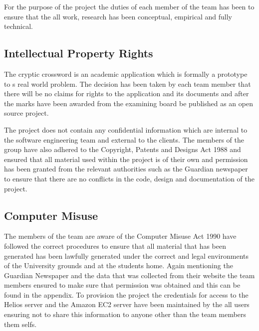 For the purpose of the project the duties of each member of the team has been to ensure that the all work, research has been conceptual, empirical and fully technical.

\subsection{Intellectual Property Rights}

The cryptic crossword is an academic application which is formally a prototype to s real world problem. The decision has been taken by each team member that there will be no claims for rights to the application and its documents and after the marks have been awarded from the examining board be published as an open source project. 

The project does not contain any confidential information which are internal to the software engineering team and external to the clients. The members of the group have also adhered to the Copyright, Patents and Designs Act 1988 and ensured that all material used within the project is of their own and permission has been granted from the relevant authorities such as the Guardian newspaper to ensure that there are no conflicts in the code, design and documentation of the project. 

\subsection{Computer Misuse}

The members of the team are aware of the Computer Misuse Act 1990 have followed the correct procedures to ensure that all material that has been generated has been lawfully generated under the correct and legal environments of the University grounds and at the students home. Again mentioning the Guardian Newspaper and the data that was collected from their website the team members ensured to make sure that permission was obtained and this can be found in the appendix. To provision the project the credentials for access to the Helios server and the Amazon EC2 server have been maintained by the all users ensuring not to share this information to anyone other than the team members them selfs.

